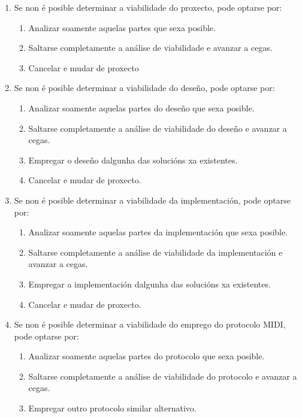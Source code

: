  \begin{enumerate}
  \item Se non é posible determinar a viabilidade do proxecto, pode optarse
        por:
        \begin{enumerate}
         \item Analizar soamente aquelas partes que sexa posible.
         \item Saltarse completamente a análise de viabilidade e avanzar a
               cegas.
         \item Cancelar e mudar de proxecto
        \end{enumerate}
  \item Se non é posible determinar a viabilidade do deseño, pode optarse por:
        \begin{enumerate}
         \item Analizar soamente aquelas partes do deseño que sexa posible.
         \item Saltarse completamente a análise de viabilidade do deseño e
               avanzar a cegas.
         \item Empregar o deseño dalgunha das solucións xa existentes.
         \item Cancelar e mudar de proxecto.
        \end{enumerate}
  \item Se non é posible determinar a viabilidade da implementación, pode
        optarse por:
        \begin{enumerate}
         \item Analizar soamente aquelas partes da implementación que sexa
               posible.
         \item Saltarse completamente a análise de viabilidade da
               implementación e avanzar a cegas.
         \item Empregar a implementación dalgunha das solucións xa existentes.
         \item Cancelar e mudar de proxecto.
        \end{enumerate}
  \item Se non é posible determinar a viabilidade do emprego do protocolo MIDI,
        pode optarse por:
        \begin{enumerate}
         \item Analizar soamente aquelas partes do protocolo que sexa posible.
         \item Saltarse completamente a análise de viabilidade do protocolo e
               avanzar a cegas.
         \item Empregar outro protocolo similar alternativo.

\end{enumerate}
\end{enumerate}
